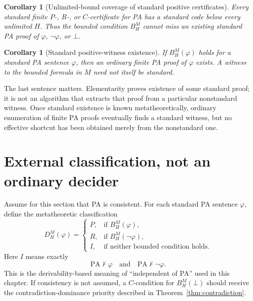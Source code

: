 \documentclass[11pt,openany]{book}
\newtheorem{corollary}[theorem]{Corollary}
\theoremstyle{definition}
\theoremstyle{remark}
\begin{document}
\begin{corollary}[Unlimited-bound coverage of standard positive certificates]\label{cor:hypercoverage}
Every standard finite \(P\)-, \(R\)-, or \(C\)-certificate for PA has a standard code below every unlimited \(H\). Thus the bounded condition \(B_H^M\) cannot miss an existing standard PA proof of \(\varphi\), \(\neg\varphi\), or \(\bot\).
\end{corollary}

\begin{corollary}[Standard positive-witness existence]\label{cor:positivehyperstandard}
If \(B_H^M(\varphi)\) holds for a standard PA sentence \(\varphi\), then an ordinary finite PA proof of \(\varphi\) exists. A witness to the bounded formula in \(M\) need not itself be standard.
\end{corollary}

The last sentence matters. Elementarity proves existence of some standard proof; it is not an algorithm that extracts that proof from a particular nonstandard witness. Once standard existence is known metatheoretically, ordinary enumeration of finite PA proofs eventually finds a standard witness, but no effective shortcut has been obtained merely from the nonstandard one.

\section{External classification, not an ordinary decider}
Assume for this section that PA is consistent. For each standard PA sentence \(\varphi\), define the metatheoretic classification
\[
D_H^M(\varphi)=
\begin{cases}
P,&\text{if }B_H^M(\varphi),\\
R,&\text{if }B_H^M(\neg\varphi),\\
I,&\text{if neither bounded condition holds.}
\end{cases}
\]
Here \(I\) means exactly
\[
\mathrm{PA}\nvdash\varphi
\quad\text{and}\quad
\mathrm{PA}\nvdash\neg\varphi.
\]
This is the derivability-based meaning of ``independent of PA'' used in this chapter. If consistency is not assumed, a \(C\)-condition for \(B_H^M(\bot)\) should receive the contradiction-dominance priority described in Theorem~\ref{thm:contradiction}.
\end{document}
